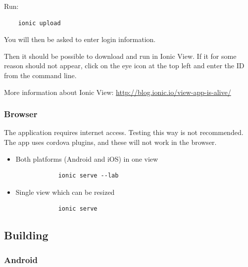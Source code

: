\begin{appendices}
\begin{itemize}
Run: 
\begin{verbatim}
	ionic upload
\end{verbatim}

You will then be asked to enter login information. 

Then it should be possible to download and run in Ionic View. If it for some reason should not appear, click on the eye icon at the top left and enter the ID from the command line. 

More information about Ionic View: \url{http://blog.ionic.io/view-app-is-alive/}

\end{itemize}

\subsubsection{Browser} 

The application requires internet access.
Testing this way is not recommended. The app uses cordova plugins, and these will not work in the browser. 
\begin{itemize}
	\item Both platforms (Android and iOS) in one view
		\begin{verbatim}
			ionic serve --lab
		\end{verbatim}
	\item Single view which can be resized
		\begin{verbatim}
			ionic serve
		\end{verbatim}
\end{itemize}


\subsection{Building}
  
\subsubsection{Android}


\end{appendices}
